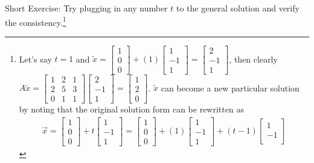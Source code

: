 Short Exercise: Try plugging in any number $t$ to the general solution and verify the consistency.\footnote{Let's say $t=1$ and $\tilde{x} = 
\begin{bmatrix}
1 \\
0 \\
0
\end{bmatrix}
+ (1)
\begin{bmatrix}
1 \\
-1 \\
1
\end{bmatrix}
=
\begin{bmatrix}
2 \\
-1 \\
1
\end{bmatrix}$, then clearly $A\tilde{x} = 
\begin{bmatrix}
1 & 2 & 1 \\
2 & 5 & 3 \\
0 & 1 & 1 
\end{bmatrix}
\begin{bmatrix}
2 \\
-1 \\
1
\end{bmatrix}
= 
\begin{bmatrix}
1 \\
2 \\
0
\end{bmatrix}$.\vspace{3pt} $\tilde{x}$ can become a new particular solution by noting that the original solution form can be rewritten as
\begin{align*}
\vec{x} =
\begin{bmatrix}
1 \\
0 \\
0
\end{bmatrix}
+ t
\begin{bmatrix}
1 \\
-1 \\
1
\end{bmatrix}
= 
\begin{bmatrix}
1 \\
0 \\
0
\end{bmatrix}
+ (1)
\begin{bmatrix}
1 \\
-1 \\
1
\end{bmatrix}
+
(t-1)
\begin{bmatrix}
1 \\
-1 \\

\end{bmatrix}
\end{align*}}
